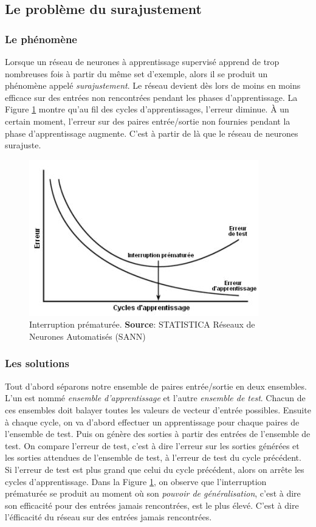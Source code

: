 \subsection{Le problème du surajustement}
\subsubsection{Le phénomène}
Lorsque un réseau de neurones à apprentissage supervisé apprend de trop nombreuses fois à partir du même set d'exemple, alors il se produit un phénomène appelé \emph{surajustement}.\cite{statistica}
Le réseau devient dès lors de moins en moins efficace sur des entrées non rencontrées pendant les phases d'apprentissage.
La Figure \ref{interruption} montre qu'au fil des cycles d'apprentissages, l'erreur diminue.
À un certain moment, l'erreur sur des paires entrée/sortie non fournies pendant la phase d'apprentissage augmente. 
C'est à partir de là que le réseau de neurones surajuste.
\begin{figure}
 \centering
 \includegraphics[scale=0.6]{../figures/surgeneralisation.jpg}
 \caption{Interruption prématurée. \textbf{Source}: STATISTICA Réseaux de Neurones Automatisés (SANN)\cite{statistica}}
 \label{interruption}
\end{figure}
\subsubsection{Les solutions}
Tout d'abord séparons notre ensemble de paires entrée/sortie en deux ensembles.
L'un est nommé \emph{ensemble d'apprentissage} et l'autre \emph{ensemble de test}.
Chacun de ces ensembles doit balayer toutes les valeurs de vecteur d'entrée possibles.
Ensuite à chaque cycle, on va d'abord effectuer un apprentissage pour chaque paires de l'ensemble de test.
Puis on génère des sorties à partir des entrées de l'ensemble de test.
On compare l'erreur de test, c'est à dire l'erreur sur les sorties générées et les sorties attendues de l'ensemble de test, à l'erreur de test du cycle précédent.
Si l'erreur de test est plus grand que celui du cycle précédent, alors on arrête les cycles d'apprentissage.
Dans la Figure \ref{interruption}, on observe que l'interruption prématurée se produit au moment où son \emph{pouvoir de généralisation}, c'est à dire son efficacité pour des entrées jamais rencontrées, est le plus élevé.
C'est à dire l'éfficacité du réseau sur des entrées jamais rencontrées.\\

